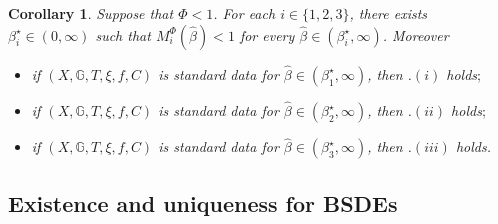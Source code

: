 \documentclass[10pt]{article} %
\newtheorem{corollary}[theorem]{Corollary}
\def \G{\mathbb{G}}
\newcommand{\1}{\mathbf{1}}
\begin{document}
\begin{corollary}\label{cor::main_result_reflected_bsde}
	Suppose that $\Phi < 1$. For each $i \in \{1,2,3\}$, there exists $\beta^\star_i \in (0,\infty)$ such that $M^\Phi_i(\hat\beta) <1$ for every $\hat\beta \in (\beta^\star_i,\infty)$. Moreover
	\begin{itemize}
		\item[$(i)$] if $(X,\G,T,\xi,f,C)$ is standard data for $\hat\beta \in (\beta^\star_1,\infty)$, then {\rm{}.$(i)$} holds$;$
		\item[$(ii)$] if $(X,\G,T,\xi,f,C)$ is standard data for $\hat\beta \in (\beta^\star_2,\infty)$, then {\rm{}.$(ii)$} holds$;$
		\item[$(iii)$] if $(X,\G,T,\xi,f,C)$ is standard data for $\hat\beta \in (\beta^\star_3,\infty)$, then {\rm{}.$(iii)$} holds.
	\end{itemize}
\end{corollary}








\subsection{Existence and uniqueness for BSDEs}\label{sec::main_results_bsde}
\end{document}
